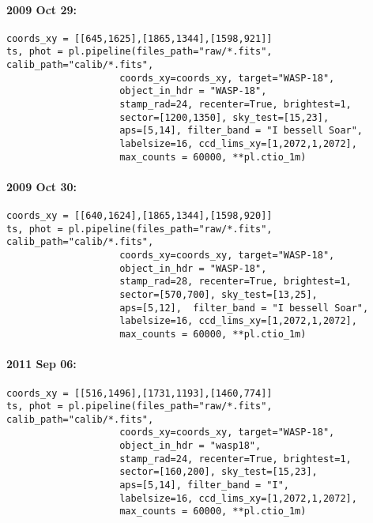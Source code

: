 \paragraph*{2009 Oct 29:}
\begin{verbatim}
coords_xy = [[645,1625],[1865,1344],[1598,921]]
ts, phot = pl.pipeline(files_path="raw/*.fits", calib_path="calib/*.fits",
                    coords_xy=coords_xy, target="WASP-18",
                    object_in_hdr = "WASP-18",
                    stamp_rad=24, recenter=True, brightest=1,
                    sector=[1200,1350], sky_test=[15,23],
                    aps=[5,14], filter_band = "I bessell Soar",
                    labelsize=16, ccd_lims_xy=[1,2072,1,2072],
                    max_counts = 60000, **pl.ctio_1m)
\end{verbatim}

\paragraph*{2009 Oct 30:}
\begin{verbatim}
coords_xy = [[640,1624],[1865,1344],[1598,920]]
ts, phot = pl.pipeline(files_path="raw/*.fits", calib_path="calib/*.fits",
                    coords_xy=coords_xy, target="WASP-18",
                    object_in_hdr = "WASP-18",
                    stamp_rad=28, recenter=True, brightest=1,
                    sector=[570,700], sky_test=[13,25],
                    aps=[5,12],  filter_band = "I bessell Soar",
                    labelsize=16, ccd_lims_xy=[1,2072,1,2072],
                    max_counts = 60000, **pl.ctio_1m)
\end{verbatim}

\paragraph*{2011 Sep 06:}
\begin{verbatim}
coords_xy = [[516,1496],[1731,1193],[1460,774]]
ts, phot = pl.pipeline(files_path="raw/*.fits", calib_path="calib/*.fits",
                    coords_xy=coords_xy, target="WASP-18",
                    object_in_hdr = "wasp18",
                    stamp_rad=24, recenter=True, brightest=1,
                    sector=[160,200], sky_test=[15,23],
                    aps=[5,14], filter_band = "I",
                    labelsize=16, ccd_lims_xy=[1,2072,1,2072],
                    max_counts = 60000, **pl.ctio_1m)
\end{verbatim}


